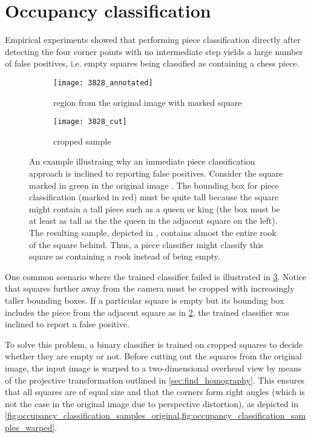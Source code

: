 \documentclass[../main.tex]{subfiles}
\begin{document}
\section{Occupancy classification}
\label{sec:occupancy_classification}
Empirical experiments showed that performing piece classification directly after detecting the four corner points with no intermediate step yields a large number of false positives, i.e. empty squares being classified as containing a chess piece.
\begin{figure}
    \centering
    \begin{subfigure}[b]{0.65\textwidth}
        \centering
        \texttt{[image: 3828\_annotated]}
        \caption{region from the original image with marked square}
        \label{fig:occupancy_classification_fp_original}
    \end{subfigure}
    \hfill
    \begin{subfigure}[b]{0.3\textwidth}
        \centering
        \texttt{[image: 3828\_cut]}
        \caption{cropped sample}
        \label{fig:occupancy_classification_fp_cropped}
    \end{subfigure}
    \caption[An example illustraing why an immediate piece classification approach is inclined to reporting false positives.]{An example illustraing why an immediate piece classification approach is inclined to reporting false positives. Consider the square marked in green in the original image . The bounding box for piece classification (marked in red) must be quite tall because the square might contain a tall piece such as a queen or king (the box must be at least as tall as the the queen in the adjacent square on the left). The resulting sample, depicted in , contains almost the entire rook of the square behind. Thus, a piece classifier might classify this square as containing a rook instead of being empty.}
    \label{fig:occupancy_classification_fp}
\end{figure}
One common scenario where the trained classifier failed is illustrated in \cref{fig:occupancy_classification_fp}.
Notice that squares further away from the camera must be cropped with increasingly taller bounding boxes.
If a particular square is empty but its bounding box includes the piece from the adjacent square as in \cref{fig:occupancy_classification_fp_cropped}, the trained classifier was inclined to report a false positive.

To solve this problem, a binary classifier is trained on cropped squares to decide whether they are empty or not.
Before cutting out the squares from the original image, the input image is warped to a two-dimensional overhead view by means of the projective transformation outlined in \cref{sec:find_homography}.
This ensures that all squares are of equal size and that the corners form right angles (which is not the case in the original image due to perspective distortion), as depicted in \cref{fig:occupancy_classification_samples_original,fig:occupancy_classification_samples_warped}.
\end{document}

